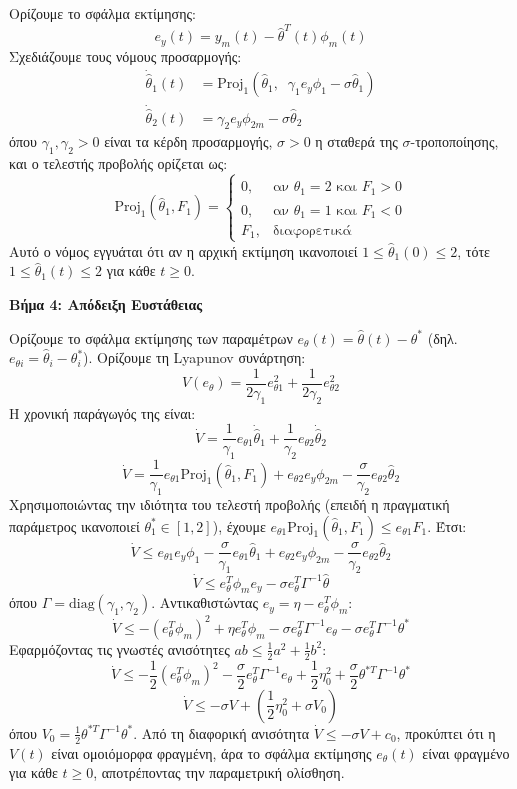 \documentclass[a4paper,11pt]{article}
\begin{document}
\begin{answer}
Ορίζουμε το σφάλμα εκτίμησης:
\[ e_y(t) = y_m(t) - \hat{\theta}^T(t) \phi_m(t) \]
Σχεδιάζουμε τους νόμους προσαρμογής:
\begin{align*}
    \dot{\hat{\theta}}_1(t) &= \text{Proj}_1\left(\hat{\theta}_1, \;\; \gamma_1 e_y \phi_1 - \sigma \hat{\theta}_1\right) \\
    \dot{\hat{\theta}}_2(t) &= \gamma_2 e_y \phi_{2m} - \sigma \hat{\theta}_2
\end{align*}
όπου $\gamma_1, \gamma_2 > 0$ είναι τα κέρδη προσαρμογής, $\sigma > 0$ η σταθερά της $\sigma$-τροποποίησης, και ο τελεστής προβολής ορίζεται ως:
\[ \text{Proj}_1\left(\hat{\theta}_1, F_1\right) = \begin{cases}
    0, & \text{αν } \hat{\theta}_1 = 2 \text{ και } F_1 > 0 \\
    0, & \text{αν } \hat{\theta}_1 = 1 \text{ και } F_1 < 0 \\
    F_1, & \text{διαφορετικά}
\end{cases} \]
Αυτό ο νόμος εγγυάται ότι αν η αρχική εκτίμηση ικανοποιεί $1 \le \hat{\theta}_1(0) \le 2$, τότε $1 \le \hat{\theta}_1(t) \le 2$ για κάθε $t \ge 0$.

\textbf{Βήμα 4: Απόδειξη Ευστάθειας}

Ορίζουμε το σφάλμα εκτίμησης των παραμέτρων $e_\theta(t) = \hat{\theta}(t) - \theta^*$ (δηλ. $e_{\theta i} = \hat{\theta}_i - \theta_i^*$).
Ορίζουμε τη Lyapunov συνάρτηση:
\[ V(e_\theta) = \frac{1}{2\gamma_1} e_{\theta 1}^2 + \frac{1}{2\gamma_2} e_{\theta 2}^2 \]
Η χρονική παράγωγός της είναι:
\[ \dot{V} = \frac{1}{\gamma_1} e_{\theta 1} \dot{\hat{\theta}}_1 + \frac{1}{\gamma_2} e_{\theta 2} \dot{\hat{\theta}}_2 \]
\[ \dot{V} = \frac{1}{\gamma_1} e_{\theta 1} \text{Proj}_1\left(\hat{\theta}_1, F_1\right) + e_{\theta 2} e_y \phi_{2m} - \frac{\sigma}{\gamma_2} e_{\theta 2} \hat{\theta}_2 \]
Χρησιμοποιώντας την ιδιότητα του τελεστή προβολής (επειδή η πραγματική παράμετρος ικανοποιεί $\theta_1^* \in [1, 2]$), έχουμε $e_{\theta 1} \text{Proj}_1(\hat{\theta}_1, F_1) \le e_{\theta 1} F_1$. Έτσι:
\[ \dot{V} \le e_{\theta 1} e_y \phi_1 - \frac{\sigma}{\gamma_1} e_{\theta 1} \hat{\theta}_1 + e_{\theta 2} e_y \phi_{2m} - \frac{\sigma}{\gamma_2} e_{\theta 2} \hat{\theta}_2 \]
\[ \dot{V} \le e_\theta^T \phi_m e_y - \sigma e_\theta^T \Gamma^{-1} \hat{\theta} \]
όπου $\Gamma = \text{diag}(\gamma_1, \gamma_2)$.
Αντικαθιστώντας $e_y = \eta - e_\theta^T \phi_m$:
\[ \dot{V} \le -(e_\theta^T \phi_m)^2 + \eta e_\theta^T \phi_m - \sigma e_\theta^T \Gamma^{-1} e_\theta - \sigma e_\theta^T \Gamma^{-1} \theta^* \]
Εφαρμόζοντας τις γνωστές ανισότητες $a b \le \frac{1}{2} a^2 + \frac{1}{2} b^2$:
\[ \dot{V} \le -\frac{1}{2} (e_\theta^T \phi_m)^2 - \frac{\sigma}{2} e_\theta^T \Gamma^{-1} e_\theta + \frac{1}{2} \eta_0^2 + \frac{\sigma}{2} \theta^{*T} \Gamma^{-1} \theta^* \]
\[ \dot{V} \le -\sigma V + \left( \frac{1}{2} \eta_0^2 + \sigma V_0 \right) \]
όπου $V_0 = \frac{1}{2} \theta^{*T} \Gamma^{-1} \theta^*$.
Από τη διαφορική ανισότητα $\dot{V} \le -\sigma V + c_0$, προκύπτει ότι η $V(t)$ είναι ομοιόμορφα φραγμένη, άρα το σφάλμα εκτίμησης $e_\theta(t)$ είναι φραγμένο για κάθε $t \ge 0$, αποτρέποντας την παραμετρική ολίσθηση.
\end{answer}
\end{document}
